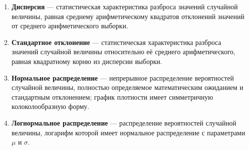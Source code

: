 \begin{enumerate}
\item \textbf{Дисперсия} --- статистическая характеристика разброса
значений случайной величины, равная среднему арифметическому квадратов
отклонений значений от среднего арифметического выборки.

\item \textbf{Стандартное отклонение} --- статистическая характеристика
разброса значений случайной величины относительно её среднего
арифметического, равная квадратному корню из дисперсии выборки.

\item \textbf{Нормальное распределение} --- непрерывное распределение
вероятностей случайной величины, полностью определяемое математическим
ожиданием и стандартным отклонением; график плотности имеет симметричную
колоколообразную форму.

\item \textbf{Логнормальное распределение} --- распределение вероятностей
случайной величины, логарифм которой имеет нормальное распределение с
параметрами $\mu$ и $\sigma$.

\end{enumerate}